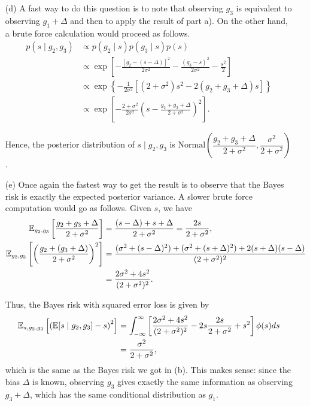 \begin{enumerate}
\item[(d)] A fast way to do this question is to note that observing $g_3$ is equivalent to observing $g_1 + \Delta$ and then to apply the result of part a). On the other hand, a brute force calculation would proceed as follows.
 \begin{align*}
p(s \mid g_2, g_3) &\propto p(g_2 \mid s) p(g_3 \mid s) p (s) \\ 
&\propto \exp \left[ - \frac{[g_2 - (s-\Delta)]^2}{2\sigma^2} - \frac{(g_3 - s)^2}{2\sigma^2} - \frac{s^2}{2} \right] \\
&\propto \exp \left\{ - \frac{1}{2\sigma^2} \left[ (2 + \sigma^2)s^2 - 2(g_2 + g_3 + \Delta) s \right] \right\} \\ 
&\propto \exp \left[ - \frac{2 + \sigma^2}{2 \sigma^2} \left( s - \frac{g_2 + g_3 + \Delta}{2 + \sigma^2} \right)^2 \right].
\end{align*}

Hence, the posterior distribution of $s \mid g_2, g_3$ is $\text{Normal}\left( \dfrac{g_2 + g_3 + \Delta}{2 + \sigma^2}, \dfrac{\sigma^2}{2 + \sigma^2} \right)$.

\item[(e)] Once again the fastest way to get the result is to observe that the Bayes risk is exactly the expected posterior variance. A slower brute force computation would go as follows. Given $s$, we have
\begin{align*}
{\mathbb E}_{g_2, g_3} \left[ \dfrac{g_2 + g_3 + \Delta}{2 + \sigma^2} \right] &= \frac{(s - \Delta) + s + \Delta}{2 + \sigma^2} = \frac{2s}{2 + \sigma^2}, \\ 
{\mathbb E}_{g_2, g_3} \left[ \left(\dfrac{g_2 + (g_3 + \Delta)}{2 + \sigma^2}\right)^2 \right] &= \frac{(\sigma^2 + (s - \Delta)^2) + (\sigma^2 + (s + \Delta)^2) + 2 (s + \Delta)(s - \Delta) }{(2 + \sigma^2)^2} \\ 
&= \frac{2\sigma^2 + 4s^2}{(2 + \sigma^2)^2}.
\end{align*}

Thus, the Bayes risk with squared error loss is given by
\begin{align*}
{\mathbb E}_{s, g_2, g_3} \left[ \left( {\mathbb E} [s \mid g_2, g_3] - s \right)^2 \right] &= \int_{-\infty}^\infty \left[\frac{2\sigma^2 + 4s^2}{(2 + \sigma^2)^2} - 2s \frac{2s}{2 + \sigma^2} + s^2 \right] \phi(s)ds \\ 
&= \frac{\sigma^2}{2 + \sigma^2},
\end{align*}
which is the same as the Bayes risk we got in (b). This makes sense: since the bias $\Delta$ is known, observing $g_3$ gives exactly the same information as observing $g_3 + \Delta$, which has the same conditional distribution as $g_1$.

	  	
\end{enumerate}